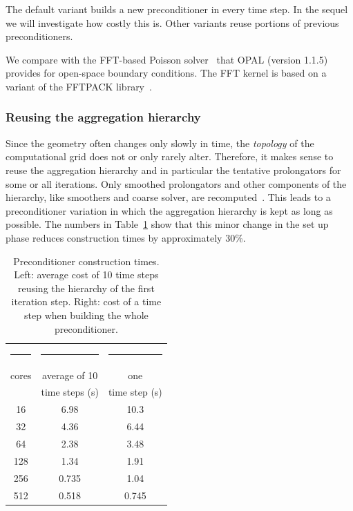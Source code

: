 The default variant builds a new preconditioner in every time step.  In
the sequel we will investigate how costly this is.  Other variants reuse
portions of previous preconditioners.

We compare with the FFT-based Poisson solver~\cite{hoea:88} that
\textsc{OPAL} (version 1.1.5) provides for open-space boundary conditions.  
The FFT kernel is based  on a variant of the FFTPACK library~\cite{FFTPACK, Swar:82}.

\subsubsection*{Reusing the aggregation hierarchy}

Since the geometry often changes only slowly in time, the
\emph{topology} of the computational grid does not or only rarely alter.
Therefore, it makes sense to reuse the aggregation hierarchy and in
particular the tentative prolongators for some or all iterations.  Only
smoothed prolongators and other components of the hierarchy, like
smoothers and coarse solver, are recomputed~\cite[p.16]{gsht:06}.
This leads to a preconditioner variation in which the aggregation
hierarchy is kept as long as possible.  The numbers in
Table~\ref{tbl:timings_reuse_hierarchy} show that this minor change in
the set up phase reduces construction times by approximately 30\%.

\begin{table}[ht]
  \begin{center}
    \begin{tabular}{ccc}
      \hline
      \rule{15mm}{0mm} & \rule{30mm}{0mm} & \rule{30mm}{0mm} \\[-4mm]
      cores & average of 10 & one \\
      &time steps (s) &  time step (s) \\
      \hline
      16  & 6.98 & 10.3 \\
      32  & 4.36 &  6.44 \\
      64  & 2.38 &  3.48 \\
      128 & 1.34 &  1.91 \\ 
      256 & 0.735 &  1.04 \\
      512 & 0.518 &  0.745 \\
      \hline
    \end{tabular}
    \caption{Preconditioner construction times.  Left: average cost of
      10 time steps reusing the hierarchy of the first iteration step.
      Right: cost of a time step when building the whole
      preconditioner.
    }
    \label{tbl:timings_reuse_hierarchy}
  \end{center}
\end{table}

